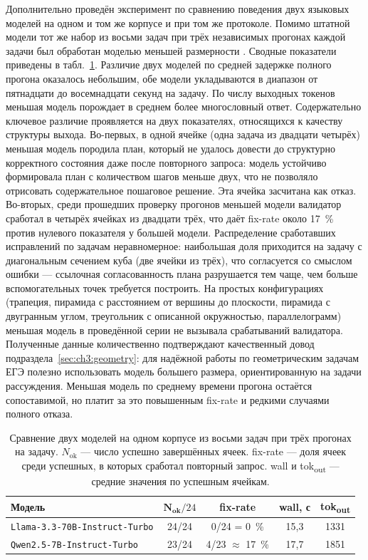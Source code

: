Дополнительно проведён эксперимент по сравнению поведения двух языковых моделей на одном и том же корпусе и при том же протоколе. Помимо штатной модели  тот же набор из восьми задач при трёх независимых прогонах каждой задачи был обработан моделью меньшей размерности . Сводные показатели приведены в табл.~\ref{tab:ch3:model-comparison}. Различие двух моделей по средней задержке полного прогона оказалось небольшим, обе модели укладываются в диапазон от пятнадцати до восемнадцати секунд на задачу. По числу выходных токенов меньшая модель порождает в среднем более многословный ответ. Содержательно ключевое различие проявляется на двух показателях, относящихся к качеству структуры выхода. Во\nobreakdash-первых, в одной ячейке (одна задача из двадцати четырёх) меньшая модель породила план, который не удалось довести до структурно корректного состояния даже после повторного запроса: модель устойчиво формировала план с количеством шагов меньше двух, что не позволяло отрисовать содержательное пошаговое решение. Эта ячейка засчитана как отказ. Во\nobreakdash-вторых, среди прошедших проверку прогонов меньшей модели валидатор сработал в четырёх ячейках из двадцати трёх, что даёт fix-rate около 17~\% против нулевого показателя у большей модели. Распределение сработавших исправлений по задачам неравномерное: наибольшая доля приходится на задачу с диагональным сечением куба (две ячейки из трёх), что согласуется со смыслом ошибки --- ссылочная согласованность плана разрушается тем чаще, чем больше вспомогательных точек требуется построить. На простых конфигурациях (трапеция, пирамида с расстоянием от вершины до плоскости, пирамида с двугранным углом, треугольник с описанной окружностью, параллелограмм) меньшая модель в проведённой серии не вызывала срабатываний валидатора. Полученные данные количественно подтверждают качественный довод подраздела~\ref{sec:ch3:geometry}: для надёжной работы по геометрическим задачам ЕГЭ полезно использовать модель большего размера, ориентированную на задачи рассуждения. Меньшая модель по среднему времени прогона остаётся сопоставимой, но платит за это повышенным fix-rate и редкими случаями полного отказа.

\begin{table}[htbp]
\centering
\caption{Сравнение двух моделей на одном корпусе из восьми задач при трёх прогонах на задачу. \(N_{\text{ok}}\) --- число успешно завершённых ячеек. fix-rate --- доля ячеек среди успешных, в которых сработал повторный запрос. wall и tok\textsubscript{out} --- средние значения по успешным ячейкам.}
\label{tab:ch3:model-comparison}
\small
\begin{tabular}{l c c c c}
\toprule
\textbf{Модель} & \(\boldsymbol{N_{\text{ok}}}/24\) & \textbf{fix-rate} & \textbf{wall, с} & \textbf{tok\textsubscript{out}} \\
\midrule
\texttt{Llama-3.3-70B-Instruct-Turbo} & 24/24 & 0/24 = 0~\%   & 15{,}3 & 1331 \\
\texttt{Qwen2.5-7B-Instruct-Turbo}    & 23/24 & 4/23 \(\approx\) 17~\% & 17{,}7 & 1851 \\
\bottomrule
\end{tabular}
\end{table}


